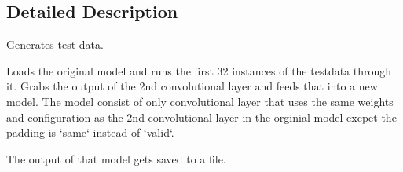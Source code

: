 \subsection{Detailed Description}
\begin{DoxyVerb}Generates test data.

Loads the original model and runs the first 32 instances of the testdata through it.
Grabs the output of the 2nd convolutional layer and feeds that into a new model. The
model consist of only convolutional layer that uses the same weights and configuration
as the 2nd convolutional layer in the orginial model excpet the padding is `same` 
instead of `valid`.

The output of that model gets saved to a file. \end{DoxyVerb}
 
